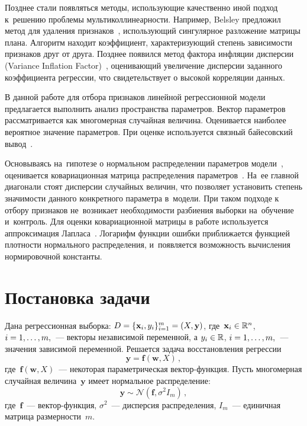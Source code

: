 \begin{multicols}{2}
Позднее стали появляться методы, ис\-поль\-зу\-ющие качественно
иной подход к~решению проб\-ле\-мы муль\-ти\-кол\-ли\-неар\-ности. Например,
Belsley предложил метод для удаления признаков~\cite{belsly},
использующий сингулярное разложение матрицы плана. Алгоритм находит
коэффициент, характеризующий степень зависимости признаков друг от
друга. Позднее появился метод фактора инфляции дис\-пер\-сии (Variance
Inflation Factor)~\cite{vif}, оценивающий увеличение дисперсии
заданного коэффициента регрессии, что свидетельствует о высокой
корреляции данных.

В данной работе для отбора признаков линейной регрессионной модели
предлагается выполнить анализ пространства параметров. Вектор
па\-ра\-мет\-ров рассматривается как многомерная случайная величина.
Оценивается наиболее вероятное значение параметров. При оценке
используется связный байесовский вывод~\cite{nabney, mackay}.

Основываясь на~гипотезе о нормальном распределении параметров
модели~\cite{weber}, оценивается ковариационная матрица
распределения па\-ра\-мет\-ров~\cite{strijov1, strijov2}. На~ее главной
диагонали стоят дис\-пер\-сии случайных величин, что позволяет
установить степень значимости данного конкретного па\-ра\-мет\-ра
в~модели. При таком подходе к~ отбору признаков не~возникает
необходимости разбиения выборки на~обучение и~контроль. Для оценки
ковариационной матрицы в работе используется аппроксимация
Лапласа~\cite{laplace}. Логарифм функции ошибки приближается
функцией плотности нормального распределения, и~появляется
воз\-мож\-ность вы\-чис\-ле\-ния нормировочной константы.



\section{Постановка задачи}

Дана регрессионная выборка: 
$D\hm=\{\mathbf{x}_i,y_i\}_{i=1}^m\hm=(X,\mathbf{y})$, 
где~$\mathbf{x}_i \hm\in \mathbb{R}^n$, $i \hm= 1, \dots, m,$~--- 
векторы независимой переменной, а $y_i \hm\in \mathbb{R}$, $i \hm= 1, \dots, m,$~--- 
значения зависимой переменной. Решается задача восстановления регрессии
\begin{equation}
\label {eq: y}
\mathbf{y}=\mathbf{f}(\mathbf{w}, X)\,,
\end{equation}
 где~$\mathbf{f}(\mathbf{w}, X)$~--- некоторая параметрическая век\-тор-функ\-ция. 
 Пусть многомерная случайная величина~$\mathbf{y}$ имеет нормальное распределение: 
 $$
 \mathbf{y}\sim\mathcal{N}(\mathbf{f},\sigma^2 I_m)\,,
 $$ 
 где~$\mathbf{f}$~--- век\-тор-функ\-ция, $\sigma^2$~--- дисперсия распределения, 
 $I_m$~--- единичная матрица размерности~$m$.


\end{multicols}
